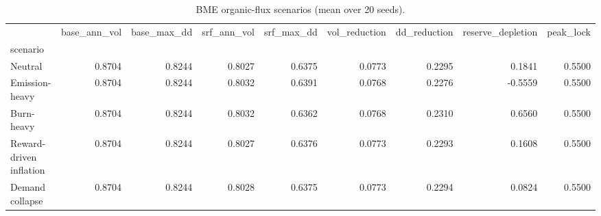 \begin{table}
\caption{BME organic-flux scenarios (mean over 20 seeds).}
\label{tab:bme}
\begin{tabular}{lrrrrrrrr}
\toprule
 & base_ann_vol & base_max_dd & srf_ann_vol & srf_max_dd & vol_reduction & dd_reduction & reserve_depletion & peak_lock \\
scenario &  &  &  &  &  &  &  &  \\
\midrule
Neutral & 0.8704 & 0.8244 & 0.8027 & 0.6375 & 0.0773 & 0.2295 & 0.1841 & 0.5500 \\
Emission-heavy & 0.8704 & 0.8244 & 0.8032 & 0.6391 & 0.0768 & 0.2276 & -0.5559 & 0.5500 \\
Burn-heavy & 0.8704 & 0.8244 & 0.8032 & 0.6362 & 0.0768 & 0.2310 & 0.6560 & 0.5500 \\
Reward-driven inflation & 0.8704 & 0.8244 & 0.8027 & 0.6376 & 0.0773 & 0.2293 & 0.1608 & 0.5500 \\
Demand collapse & 0.8704 & 0.8244 & 0.8028 & 0.6375 & 0.0773 & 0.2294 & 0.0824 & 0.5500 \\
\bottomrule
\end{tabular}
\end{table}
